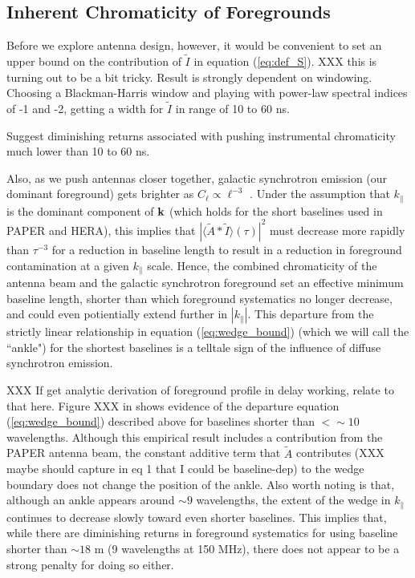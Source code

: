 \documentclass[11pt]{article}
\newcommand{\kvec}{{\bf k}}
\newcommand{\kpl}{{k_\parallel}}
\newcommand{\AI}{{\langle\tilde A*\tilde I\rangle}}
\newcommand{\AItau}{{\AI(\tau)}}
\newcommand{\lsim}{{<\sim}} %
\begin{document}
\subsection{Inherent Chromaticity of Foregrounds}

Before we explore antenna design, however, it would be convenient to set an upper bound on the contribution of
$\tilde I$ in equation (\ref{eq:def_S}).  XXX this is turning out to be a bit tricky.  Result is strongly
dependent on windowing.  Choosing a Blackman-Harris window and playing with power-law spectral indices of
-1 and -2, getting a width for $\tilde I$ in range of 10 to 60 ns.

Suggest diminishing returns associated with pushing instrumental chromaticity much lower than 10 to 60 ns.

Also, as we push antennas closer together, galactic synchrotron emission (our dominant foreground) gets
brighter as $C_\ell\propto\ell^{-3}$ \citep{}.
Under the assumption that $\kpl$ is the dominant component of $\kvec$ (which
holds for the short baselines used in PAPER and HERA),
this implies that $|\AItau|^2$ must decrease more rapidly than $\tau^{-3}$ for a reduction in baseline length
to result in a reduction in foreground contamination at a given $\kpl$ scale.  Hence, the combined chromaticity
of the antenna beam and the galactic synchrotron foreground set an effective minimum baseline length, shorter
than which foreground systematics no longer decrease, and could even potientially extend further in $|\kpl|$.  
This departure from the
strictly linear relationship in equation (\ref{eq:wedge_bound}) (which we will call the ``ankle")
for the shortest baselines is a telltale sign
of the influence of diffuse synchrotron emission.

XXX If get analytic derivation of foreground profile in delay working, relate to that here.
Figure XXX in \citet{pober_et_al2013}
shows evidence of the departure equation (\ref{eq:wedge_bound}) described above for baselines shorter than
$\lsim10$ wavelengths.  Although this empirical result includes a contribution from the PAPER antenna beam,
the constant additive term that $\tilde A$ contributes (XXX maybe should capture in eq 1 that I could be baseline-dep)
to the wedge boundary does not change the position of the ankle.  Also worth noting is that, although an ankle
appears around $\sim9$ wavelengths, the extent of the wedge in $\kpl$ continues to decrease slowly toward 
even shorter baselines.  This implies that, while there are diminishing returns in foreground systematics for using
baseline shorter than $\sim18$ m (9 wavelengths at 150 MHz), there does not appear to be a strong penalty 
for doing so either.
\end{document}
